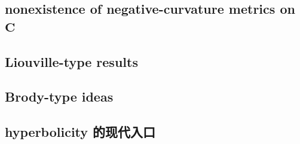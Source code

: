 

\subsection{nonexistence of negative-curvature metrics on \texorpdfstring{\(\mathbf C\)}{m}}
\label{b3:subsec:140601}

\subsection{Liouville-type results}
\label{b3:subsec:140602}

\subsection{Brody-type ideas}
\label{b3:subsec:140603}

\subsection{hyperbolicity 的现代入口}
\label{b3:subsec:140604}


